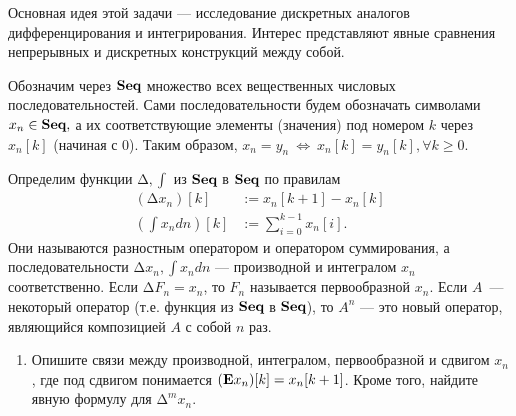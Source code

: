 ﻿

Основная идея этой задачи --- исследование дискретных аналогов дифференцирования и интегрирования. Интерес представляют явные сравнения непрерывных и дискретных конструкций между собой. 

Обозначим через $\text{\bfseries Seq}$ множество всех вещественных числовых последовательностей. Сами последовательности будем обозначать символами $x_n \in \text{\bfseries Seq},$ а их соответствующие элементы (значения) под номером $k$ через $x_n[k]$ (начиная с 0). Таким образом, $x_n = y_n \ \Longleftrightarrow \ x_n[k] = y_n[k], \forall k \geq 0$. 

Определим функции $\text{Δ}, \int$ из $\text{\bfseries Seq}$ в $\text{\bfseries Seq}$ по правилам 
\begin{align*}
(\text{Δ} x_n)[k] &:= x_n[k+1] - x_n[k] \\
\left(\int x_n dn\right) [k] &:= \sum_{i=0}^{k-1} x_n[i].
\end{align*}
Они называются разностным оператором и оператором суммирования, а последовательности $\text{Δ} x_n, \int x_n dn$ --- производной и интегралом $x_n$ соответственно. Если $\text{Δ} F_n = x_n$, то $F_n$ называется первообразной $x_n$. Если $A$~— некоторый оператор (т.е. функция из $\text{\bfseries Seq}$ в $\text{\bfseries Seq}$), то $A^n$ --- это новый оператор, являющийся композицией $A$ с собой $n$ раз. 

\begin{enumerate}
\setcounter{enumi}{0}
\item Опишите связи между производной, интегралом, первообразной и сдвигом $x_n$, где под сдвигом понимается $(\text{\bfseries E}x_n)[k] = x_n[k+1]$. Кроме того, найдите явную формулу для $\text{Δ}^m x_n$.
\end{enumerate}

